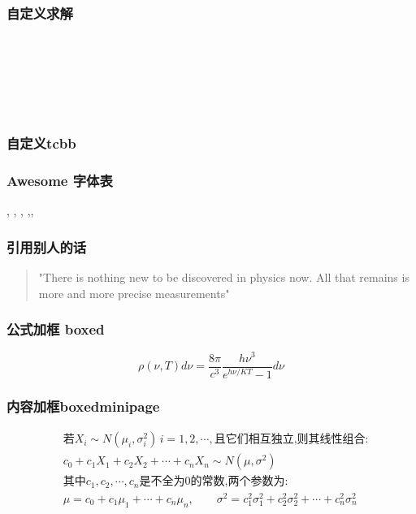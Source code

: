 \begin{frame}
  \frametitle{自定义求解}
  \解	\\
  \Solution \\

  \Tips \\
  \Note \\
  \证 \\
\end{frame}

\begin{frame}
  \frametitle{自定义tcbb}
\end{frame}

\begin{frame}
  \frametitle{Awesome 字体表}
  \alert{\faHeartbeat, \faStar, \faThumbTack, \faThumbsUp,\faUniversity, \faCircle}
\end{frame}

\begin{frame}
  \frametitle{引用别人的话}
  \begin{quotation}
    "There is nothing new to be discovered in physics now. All that remains is
    more and more precise measurements"   \\
\end{quotation}
\end{frame}

\begin{frame}
  \frametitle{公式加框 boxed}
  \begin{equation}
    \boxed{\rho(\nu, T) d \nu=\frac{8 \pi}{c^{3}} \frac{h \nu^{3}}{e^{h \nu / K T}-1} d \nu}
  \end{equation}

\end{frame}

\begin{frame}
  \frametitle{内容加框boxedminipage}
  \begin{boxedminipage}{0.9\linewidth}
    \[\begin{aligned}
    & \text{若}X_i\sim N(\mu_i,\sigma_i^2)\, i=1,2,\cdots,\text{且它们相互独立,则其线性组合:}\\
    & c_0+c_1X_1+c_2X_2+\cdots+c_nX_n\sim N(\mu,\sigma^2)\\
    & \text{其中}c_1,c_2,\cdots,c_n \text{是不全为0的常数,两个参数为:}\\
    & \mu=c_0+c_1\mu_1+\cdots+c_n\mu_n,\qquad \sigma^2=c_1^2\sigma_1^2+c_2^2\sigma_2^2+\cdots+c_n^2\sigma_n^2
    \end{aligned}\]
    \vspace{2pt}
    \end{boxedminipage}
\end{frame}

